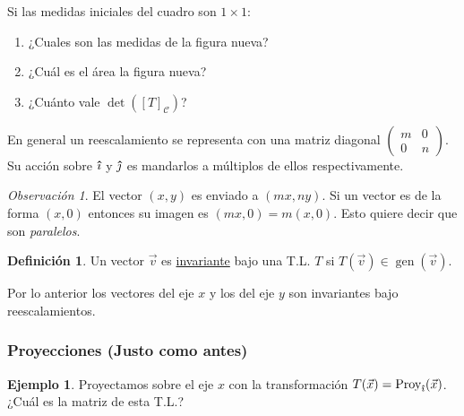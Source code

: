 \documentclass[12pt]{article}
\theoremstyle{plain}
\theoremstyle{definition}
\newtheorem*{Def}{Definición}       %
\newtheorem{Ex}[Th]{Ejemplo}           %
\theoremstyle{remark}
\newtheorem*{Rmk}{Observación}      %
\DeclareMathOperator{\gen}{gen}     %
\DeclareMathOperator{\Proy}{Proy}   %
\newcommand{\ii}{\vu{\imath}}
\newcommand{\jj}{\vu{\jmath}}
\newcommand{\cC}{\mathcal{C}}       %
\newcommand{\x}{\times}             %
\renewcommand{\:}{\colon}           %
\newcommand{\un}[1]{\underline{#1}}
\renewcommand{\.}{\Cdot}                %
\newcommand{\twobytwo}[4]{\begin{pmatrix} %
    #1 & #2 \\ #3 & #4 \end{pmatrix}}
\begin{document}
\begin{multicols}{2}
\begin{ptcbP}
Si las medidas iniciales del cuadro son $1\x 1$: 
\vspace*{-1em}
\begin{enumerate}
    \itemsep=-0.42em
    \item ¿Cuales son las medidas de la figura nueva? 
    \item ¿Cuál es el área la figura nueva?
    \item ¿Cuánto vale $\det([T]_\cC)$? 
\end{enumerate}
\end{ptcbP}

En general un reescalamiento se representa con una matriz diagonal $\twobytwo{m}{0}{0}{n}$. Su acción sobre $\ii$ y $\jj$ es mandarlos a múltiplos de ellos respectivamente.

\begin{Rmk}
    El vector $(x,y)$ es enviado a $(mx,ny)$. Si un vector es de la forma $(x,0)$ entonces su imagen es $(mx,0)=m(x,0)$. Esto quiere decir que son \emph{paralelos}.
\end{Rmk}

\begin{Def}
Un vector $\vec{v}$ es \un{invariante} bajo una T.L. $T$ si $T(\vec{v})\in\gen(\vec{v})$.
\end{Def}

Por lo anterior los vectores del eje $x$ y los del eje $y$ son invariantes bajo reescalamientos.

\subsubsection*{Proyecciones (Justo como antes)}

\begin{Ex}
    Proyectamos sobre el eje $x$ con la transformación $T(\vec{x})=\Proy_{\ii}(\vec{x})$. ¿Cuál es la matriz de esta T.L.?
    \begin{multicols*}{2}
        \begin{tikzpicture}[x=0.75pt,y=0.75pt,yscale=-1,xscale=1]
            

\end{tikzpicture}
\end{multicols*}
\end{Ex}
\end{multicols}
\end{document}
